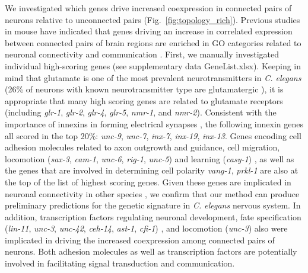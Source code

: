 \documentclass[10pt,letterpaper]{article}
\begin{document}
{We investigated which genes drive increased coexpression in connected pairs of neurons relative to unconnected pairs (Fig.~\ref{fig:topology_rich}).
Previous studies in mouse have indicated that genes driving an increase in correlated expression between connected pairs of brain regions are enriched in GO categories related to neuronal connectivity and communication \cite{Fulcher:2016ck, Ji:2014jw, Fakhry:2015kl, French:2011cz}.
First, we manually investigated individual high-scoring genes (see supplementary data GeneList.xlsx). 
Keeping in mind that glutamate is one of the most prevalent neurotransmitters in \textit{C. elegans} (26\% of neurons with known neurotransmitter type are glutamatergic \cite{Pereira:2015er}), it is appropriate that many high scoring genes are related to glutamate receptors (including \emph{glr-1}, \emph{glr-2}, \emph{glr-4}, \emph{glr-5}, \emph{nmr-1}, and \emph{nmr-2}).
Consistent with the importance of innexins in forming electrical synapses \cite{Starich2001}, the following innexin genes all scored in the top 20\%: \emph{unc-9}, \emph{unc-7}, \emph{inx-7}, \emph{inx-19}, \emph{inx-13}.
Genes encoding cell adhesion molecules related to axon outgrowth and guidance, cell migration, locomotion (\emph{sax-3}, \emph{cam-1}, \emph{unc-6}, \emph{rig-1}, \emph{unc-5}) and learning (\emph{casy-1}) \cite{Zallen1999, Garriga1999, Leung-Hagesteijn1992, Harris:2009kd, Ikeda2008},
as well as the genes that are involved in determining cell polarity \emph{vang-1}, \emph{prkl-1} \cite{Wu2006, Hoffmann2010} are also at the top of the list of highest scoring genes. 
Given these genes are implicated in neuronal connectivity in other species \cite{Paemka2013, Ehaideb2016, Sowers2013}, we confirm that our method can produce preliminary predictions for the genetic signature in \textit{C. elegans} nervous system. 
In addition, transcription factors regulating neuronal development,
fate specification (\emph{lin-11}, \emph{unc-3}, \emph{unc-42}, \emph{ceh-14}, \emph{ast-1}, \emph{cfi-1}) \cite{Sarafi-Reinach2001 ,Prasad2008, Baran1999, Cassata2000, Schmid2006, Shaham2002a},
and locomotion (\emph{unc-3}) \cite{Prasad2008} 
also were implicated in driving the increased coexpression among connected pairs of neurons. 
Both adhesion molecules as well as transcription factors are potentially involved in facilitating signal transduction and communication.\\
}
\end{document}
